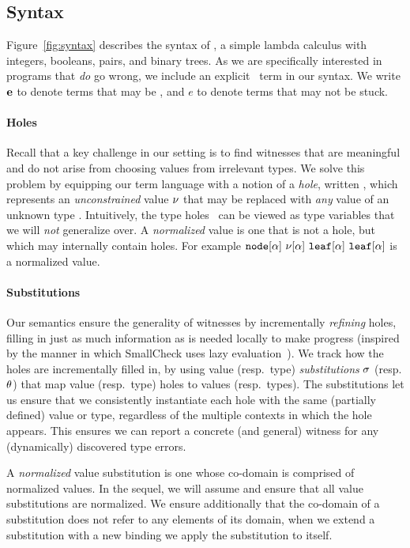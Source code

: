 \subsection{Syntax}
\label{sec:syntax}

%
Figure~\ref{fig:syntax} describes the syntax of \lang, a simple lambda
calculus with integers, booleans, pairs, and binary trees.
%
As we are specifically interested in programs that \emph{do} go wrong,
we include an explicit \stuck\ term in our syntax. We write $\mathbf{e}$ to
denote terms that may be \stuck, and $e$ to denote terms that may not be
stuck.

\paragraph{Holes}
\label{sec:holes}
%
Recall that a key challenge in our setting is to find witnesses
that are meaningful and do not arise from choosing values from
irrelevant types.
%
We solve this problem by equipping our term language with a
notion of a \emph{hole}, written \vhole{\thole}, which represents
an \emph{unconstrained} value $\nu$ that may be replaced with
\emph{any} value of an unknown type \thole.
%
Intuitively, the type holes \thole\ can be viewed as type variables
that we will \emph{not} generalize over.
%
A \emph{normalized} value is one that is not a hole,
but which may internally contain holes.
%
For example
$\mathtt{node}[\alpha]\ \nu[\alpha]\ \mathtt{leaf}[\alpha]\ \mathtt{leaf}[\alpha]$ is a
normalized value.

\paragraph{Substitutions}
%
Our semantics ensure the generality of witnesses by incrementally
\emph{refining} holes, filling in just as much information as is
needed locally to make progress (inspired by the manner in
which SmallCheck uses lazy evaluation~\cite{Runciman2008-ka}).
%
We track how the holes are incrementally filled in, by using
value (resp.\ type) \emph{substitutions} $\sigma$ (resp. $\theta$)
that map value (resp.\ type) holes to values (resp.\ types).
%
The substitutions let us ensure that we consistently instantiate each
hole with the same (partially defined) value or type, regardless of the
multiple contexts in which the hole appears.
%
This ensures we can report a concrete (and general) witness for any
(dynamically) discovered type errors.

A \emph{normalized} value substitution is one whose co-domain is
comprised of normalized values.
%
In the sequel, we will assume and ensure that all value substitutions
are normalized.
%
We ensure additionally that the co-domain of a substitution does not
refer to any elements of its domain, \ie when we extend a substitution
with a new binding we apply the substitution to itself.

